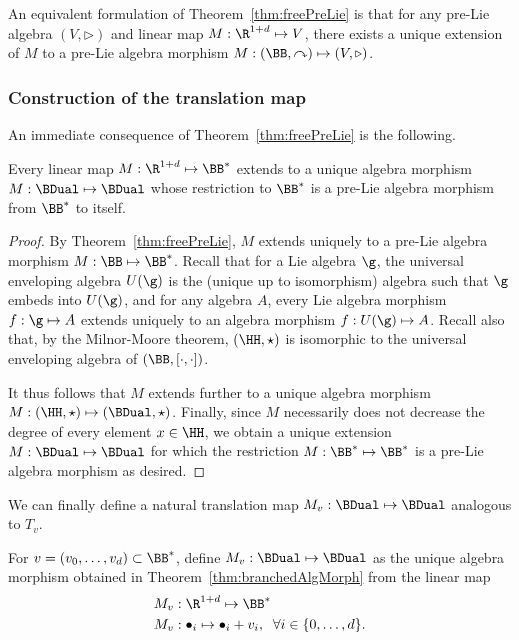 \documentclass{article}
\begin{document}
An equivalent formulation of Theorem~\ref{thm:freePreLie} is that for any pre-Lie algebra $(V, \triangleright)$ and linear map $M : \R^{1+d} \mapsto V$, there exists a unique extension of $M$ to a pre-Lie algebra morphism $M : (\BB,\curvearrowright) \mapsto (V, \triangleright)$.


\subsubsection{Construction of the translation map}\label{subsubsec:TransBranched}

An immediate consequence of Theorem~\ref{thm:freePreLie} is the following.

\begin{theorem}\label{thm:branchedAlgMorph}
Every linear map $M : \R^{1+d} \mapsto \BB^*$ extends to a unique algebra morphism $M : \BDual \mapsto \BDual$ whose restriction to $\BB^*$ is a pre-Lie algebra morphism from $\BB^*$ to itself.
\end{theorem}

\begin{proof}
By Theorem~\ref{thm:freePreLie}, $M$ extends uniquely to a pre-Lie algebra morphism $M : \BB \mapsto \BB^*$. Recall that for a Lie algebra $\g$, the universal enveloping algebra $U(\g)$ is the (unique up to isomorphism) algebra such that $\g$ embeds into $U(\g)$, and for any algebra $A$, every Lie algebra morphism $f : \g \mapsto A$ extends uniquely to an algebra morphism $f : U(\g) \mapsto A$. Recall also that, by the Milnor-Moore theorem, $(\HH,\star)$ is isomorphic to the universal enveloping algebra of $(\BB, [\cdot,\cdot])$.

It thus follows that $M$ extends further to a unique algebra morphism $M : (\HH,\star) \mapsto (\BDual, \star)$. Finally, since $M$ necessarily does not decrease the degree of every element $x \in \HH$, we obtain a unique extension $M : \BDual \mapsto \BDual$ for which the restriction $M : \BB^* \mapsto \BB^*$ is a pre-Lie algebra morphism as desired.
\end{proof}


We can finally define a natural translation map $M_v : \BDual \mapsto \BDual$ analogous to $T_v$.

\begin{definition}
For $v = (v_0,\ldots, v_d) \subset \BB^*$, define $M_v : \BDual \mapsto \BDual$ as the unique algebra morphism obtained in Theorem~\ref{thm:branchedAlgMorph} from the linear map
\begin{align*}
M_v &: \R^{1+d} \mapsto \BB^* \\
M_v &: \bullet_i \mapsto \bullet_i + v_i,  \; \; \forall i \in \{0,\ldots, d\}.
\end{align*}
\end{definition}
\end{document}

